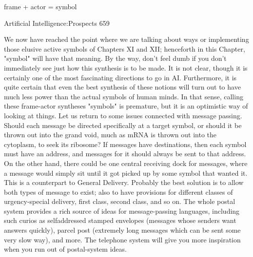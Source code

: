                                     frame + actor = symbol




Artificial Intelligence:Prospects                                                      659

We now have reached the point where we are talking about ways or implementing those
elusive active symbols of Chapters XI and XII; henceforth in this Chapter, "symbol" will
have that meaning. By the way, don't feel dumb if you don't immediately see just how
this synthesis is to be made. It is not clear, though it is certainly one of the most
fascinating directions to go in AI. Furthermore, it is quite certain that even the best
synthesis of these notions will turn out to have much less power than the actual symbols
of human minds. In that sense, calling these frame-actor syntheses "symbols" is
premature, but it is an optimistic way of looking at things.
        Let us return to some issues connected with message passing. Should each
message be directed specifically at a target symbol, or should it be thrown out into the
grand void, much as mRNA is thrown out into the cytoplasm, to seek its ribosome? If
messages have destinations, then each symbol must have an address, and messages for it
should always be sent to that address. On the other hand, there could be one central
receiving dock for messages, where a message would simply sit until it got picked up by
some symbol that wanted it. This is a counterpart to General Delivery. Probably the best
solution is to allow both types of message to exist; also to have provisions for different
classes of urgency-special delivery, first class, second class, and so on. The whole postal
system provides a rich source of ideas for message-passing languages, including such
curios as selfaddressed stamped envelopes (messages whose senders want answers
quickly), parcel post (extremely long messages which can be sent some very slow way),
and more. The telephone system will give you more inspiration when you run out of
postal-system ideas.

